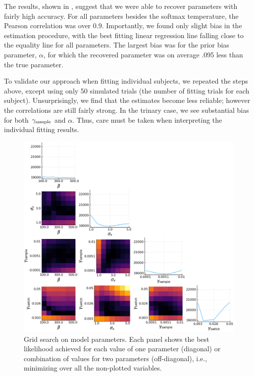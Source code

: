 
The results, shown in , suggest that we were able to recover parameters with fairly high accuracy. For all parameters besides the softmax temperature, the Pearson correlation was over 0.9. Importantly, we found only slight bias in the estimation procedure, with the best fitting linear regression line falling close to the equality line for all parameters. The largest bias was for the prior bias parameter, $\alpha$, for which the recovered parameter was on average .095 less than the true parameter.

To validate our approach when fitting individual subjects, we repeated the steps above, except using only 50 simulated trials (the number of fitting trials for each subject). Unsurprisingly, we find that the estimates become less reliable; however the correlations are still fairly strong. In the trinary case, we see substantial bias for both $\gamma_\text{sample}$ and $\alpha$. Thus, care must be taken when interpreting the individual fitting results.


\begin{figure}[hb!]
  \centering
  \includegraphics[width=\textwidth]{figs/attention/supp-grid-both.png}
  \caption{Grid search on model parameters. Each panel shows the best likelihood achieved for each value of one parameter (diagonal) or combination of values for two parameters (off-diagonal), i.e., minimizing over all the non-plotted variables.
  }
  \label{fig:attention-grid}
\end{figure}

